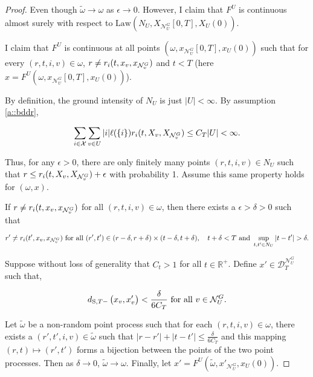 \documentclass[12pt]{article}
\newcommand{\mb}{\mathbb}
\newcommand{\mc}{\mathcal}
\newcommand{\ra}{\rightarrow}
\newcommand{\te}{\text}
\newcommand{\ep}{\epsilon}
\newcommand{\ind}{\hspace{24pt}}
\newcommand{\cad}{\mc{D}}							%
\newcommand{\sta}{\mc{X}}							%
\newcommand{\gneigh}[2]{\mc{N}^{#1}_{#2}}			%
\newcommand{\Xf}{X}									%
\newcommand{\poiss}{N}								%
\newcommand{\Sm}{\ell}								%
\newcommand{\rate}{r}								%
\newcommand{\stmet}[1]{
\ifstrempty{#1}{
	d_{\te{S}}}{
	d_{\te{S},#1}}}									%
\newcommand{\xf}{x}									%
\newcommand{\dpoiss}{\omega}						%
\newcommand{\poissv}[1]{_{#1}}						%
\newcommand{\vind}[1]{_{#1}}						%
\newcommand{\tme}[1]{(#1)}							%
\newcommand{\tmi}[1]{#1}							%
\newcommand{\vpara}[1]{^{#1}}						%
\newcommand{\stpara}[1]{_{#1}}						%
\newcommand{\tpara}[1]{_{#1}}						%
\newcommand{\jumpbd}[1]{C_{#1}}						%
\newcommand{\tmepro}[3]{
\ifstrempty{#3}{
	(#1,#2)}{
	(#1,#2,#3)}}									%
\newcommand{\alt}[1]{\tilde{#1}}					%
\newcommand{\law}{\te{Law}}							%
\begin{document}
\begin{proof}
Even though \(\alt{\dpoiss} \ra \dpoiss\) as \(\ep \ra 0\). However, I claim that \(F\vpara{U}\) is continuous almost surely with respect to \(\law\left(\poiss\poissv{U},\Xf\vind{\gneigh{G}{U}}\tmi{[0,T]},\Xf\vind{U}\tme{0}\right)\).

\ind I claim that \(F\vpara{U}\) is continuous at all points \((\dpoiss,\xf\vind{\gneigh{G}{U}}\tmi{[0,T]},\xf\vind{U}\tme{0})\) such that for every \((r,t,i,v) \in \dpoiss\), \(r \neq \rate\stpara{i}\tmepro{t}{\xf\vind{v}}{\xf\vind{\gneigh{G}{v}}}\) and \(t < T\) (here \(\xf = F\vpara{U}(\dpoiss,\xf\vind{\gneigh{G}{U}}\tmi{[0,T]},\xf\vind{U}\tme{0})\)).

\ind By definition, the ground intensity of \(\poiss\poissv{U}\) is just \(|U| < \infty\). By assumption \ref{a::bddr}, 

\[\sum_{i\in \sta}\sum_{v \in U} |i|\Sm(\{i\})\rate\stpara{i}\tmepro{t}{\Xf\vind{v}}{\Xf\vind{\gneigh{G}{v}}} \leq \jumpbd{T}|U| < \infty.\]

Thus, for any \(\ep > 0\), there are only finitely many points \((r,t,i,v) \in \poiss\poissv{U}\) such that \(r \leq \rate\stpara{i}\tmepro{t}{\Xf\vind{v}}{\Xf\vind{\gneigh{G}{v}}} + \ep\) with probability 1. Assume this same property holds for \((\dpoiss,\xf)\). 

\ind If \(r \neq \rate\stpara{i}\tmepro{t}{\xf\vind{v}}{\xf\vind{\gneigh{G}{v}}}\) for all \((r,t,i,v) \in \dpoiss\), then there exists a \(\ep > \delta > 0\) such that 

\[r' \neq \rate\stpara{i}\tmepro{t'}{\xf\vind{v}}{\xf\vind{\gneigh{G}{v}}} \te{ for all } (r',t') \in (r-\delta,r+\delta)\times (t-\delta,t+\delta),\quad t + \delta < T\te{ and } \sup_{t,t'\in \poiss\poissv{U}} |t - t'| > \delta.\]


\ind Suppose without loss of generality that \(C_t > 1\) for all \(t\in \mb{R}^+\). Define \(\xf' \in \cad\vpara{\gneigh{G}{U}}\tpara{T}\) such that,

\[\stmet{T-}\left(\xf\vind{v},\xf'\vind{v}\right) < \frac{\delta}{6\jumpbd{T}} \te{ for all } v \in \gneigh{G}{U}.\]

Let \(\alt{\dpoiss}\) be a non-random point process such that for each \((r,t,i,v) \in \dpoiss\), there exists a \((r',t',i,v) \in \alt{\dpoiss}\) such that \(|r - r'| + |t - t'| \leq \frac{\delta}{6\jumpbd{T}}\) and this mapping \((r,t) \mapsto (r',t')\) forms a bijection between the points of the two point processes. Then as \(\delta \ra 0\), \(\alt{\dpoiss} \ra \dpoiss\). Finally, let \(\xf' = F^U(\alt{\dpoiss},\xf'\vind{\gneigh{G}{U}},\xf\vind{U}\tme{0})\).


\end{proof}
\end{document}
